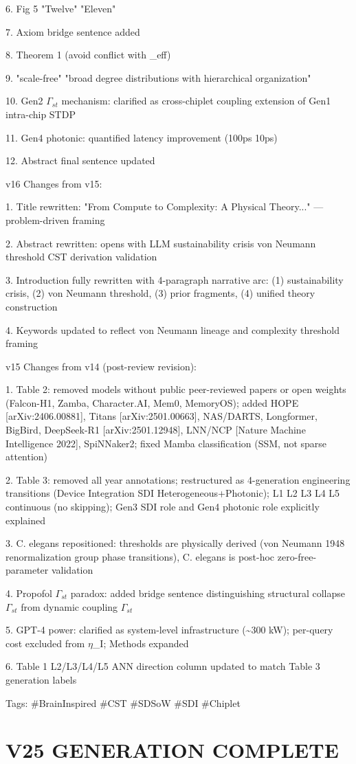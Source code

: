 \documentclass[a4paper,12pt]{article}
\begin{document}
6. Fig 5 "Twelve"  \rightarrow  "Eleven"

7. Axiom bridge sentence added

8. Theorem 1  \lambda   \rightarrow   \mu  (avoid conflict with  \lambda \_eff)

9. "scale-free"  \rightarrow  "broad degree distributions with hierarchical organization"

10. Gen2 $\Gamma_{st}$ mechanism: clarified as cross-chiplet coupling extension of Gen1 intra-chip STDP

11. Gen4 photonic: quantified latency improvement (100ps \rightarrow 10ps)

12. Abstract final sentence updated

v16 Changes from v15:

1. Title rewritten: "From Compute to Complexity: A Physical Theory..." --- problem-driven framing

2. Abstract rewritten: opens with LLM sustainability crisis  \rightarrow  von Neumann threshold  \rightarrow  CST derivation  \rightarrow  validation

3. Introduction fully rewritten with 4-paragraph narrative arc: (1) sustainability crisis, (2) von Neumann threshold, (3) prior fragments, (4) unified theory construction

4. Keywords updated to reflect von Neumann lineage and complexity threshold framing

v15 Changes from v14 (post-review revision):

1. Table 2: removed models without public peer-reviewed papers or open weights (Falcon-H1, Zamba, Character.AI, Mem0, MemoryOS); added HOPE [arXiv:2406.00881], Titans [arXiv:2501.00663], NAS/DARTS, Longformer, BigBird, DeepSeek-R1 [arXiv:2501.12948], LNN/NCP [Nature Machine Intelligence 2022], SpiNNaker2; fixed Mamba classification (SSM, not sparse attention)

2. Table 3: removed all year annotations; restructured as 4-generation engineering transitions (Device \rightarrow Integration \rightarrow SDI \rightarrow Heterogeneous+Photonic); L1 \rightarrow L2 \rightarrow L3 \rightarrow L4 \rightarrow L5 continuous (no skipping); Gen3 SDI role and Gen4 photonic role explicitly explained

3. C. elegans repositioned: thresholds are physically derived (von Neumann 1948  \rightarrow  renormalization group  \rightarrow  phase transitions), C. elegans is post-hoc zero-free-parameter validation

4. Propofol $\Gamma_{st}$ paradox: added bridge sentence distinguishing structural collapse $\Gamma_{st}$ from dynamic coupling $\Gamma_{st}$

5. GPT-4 power: clarified as system-level infrastructure (\textasciitilde{}300 kW); per-query cost excluded from $\eta$\_I; Methods expanded

6. Table 1 L2/L3/L4/L5 ANN direction column updated to match Table 3 generation labels

Tags: \#BrainInspired \#CST \#SDSoW \#SDI \#Chiplet

\section*{V25 GENERATION COMPLETE}
\end{document}
